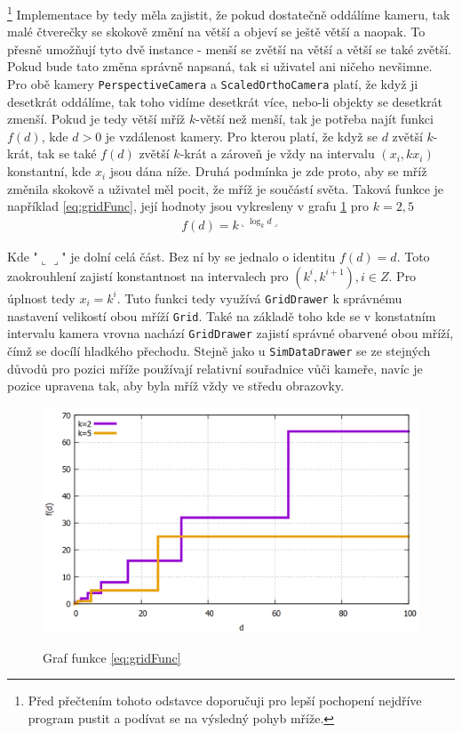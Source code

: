 \footnote{Před přečtením tohoto odstavce doporučuji pro lepší pochopení nejdříve program pustit a podívat se na výsledný pohyb mříže.} Implementace by tedy měla zajistit, že pokud dostatečně oddálíme kameru, tak malé čtverečky se skokově změní na větší a objeví se ještě větší a naopak. To přesně umožňují tyto dvě instance - menší se zvětší na větší a větší se také zvětší. Pokud bude tato změna správně napsaná, tak si uživatel ani ničeho nevšimne. Pro obě kamery \texttt{PerspectiveCamera} a \texttt{ScaledOrthoCamera} platí, že když ji desetkrát oddálíme, tak toho vidíme desetkrát více, nebo-li objekty se desetkrát zmenší. Pokud je tedy větší mříž $ k $-větší než menší, tak je potřeba najít funkci $ f(d) $, kde $ d>0 $ je vzdálenost kamery. Pro kterou platí, že když se $ d $ zvětší $ k$-krát, tak se také $ f(d) $ zvětší $ k $-krát a zároveň je vždy na intervalu $ (x_i,kx_i) $ konstantní, kde $ x_i $ jsou dána níže. Druhá podmínka je zde proto, aby se mříž změnila skokově a uživatel měl pocit, že mříž je součástí světa. Taková funkce je například \ref{eq:gridFunc}, její hodnoty jsou vykresleny v grafu \ref{graf:cameraFunc} pro $ k=2,5 $
\begin{align}
\label{eq:gridFunc}
f(d) = k^{\llcorner\log_kd\lrcorner}
\end{align}

Kde "$ \llcorner\lrcorner $" je dolní celá část. Bez ní by se jednalo o identitu $ f(d)=d $. Toto zaokrouhlení zajistí konstantnost na intervalech pro $ (k^i,k^{i+1}) , i\in Z $. Pro úplnost tedy $ x_i=k^i $.
Tuto funkci tedy využívá \texttt{GridDrawer} k správnému nastavení velikostí obou mříží \texttt{Grid}. Také na základě toho kde se v konstatním intervalu kamera vrovna nachází \texttt{GridDrawer} zajistí správné obarvené obou mříží, čímž se docílí hladkého přechodu.
Stejně jako u \texttt{SimDataDrawer} se ze stejných důvodů pro pozici mříže používají relativní souřadnice vůči kameře, navíc je pozice upravena tak, aby byla mříž vždy ve středu obrazovky.
\begin{figure}[h]
	\caption{Graf funkce \ref{eq:gridFunc}}
	\label{graf:cameraFunc}
	\centering
	\includegraphics[width=\linewidth,keepaspectratio]{Figs/plotCameraFnc}\\
\end{figure}
\FloatBarrier

